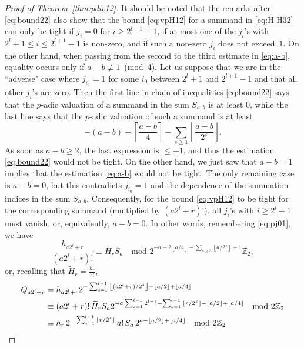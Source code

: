 \documentclass[12pt,reqno]{amsart}
\numberwithin{equation}{section}
\theoremstyle{remark}
\begin{document}
\begin{proof}[Proof of Theorem~{\em \ref{thm:pdiv12}}]
It should be noted that the remarks after \eqref{eq:bound22} also
show that the bound \eqref{eq:vpH12} for a summand in \eqref{eq:H-H32} 
can only be tight if
$j_i=0$ for $i\ge 2^{l+1}+1$, if at most one of the $j_i$'s with
$2^{l}+1\le i\le 2^{l+1}-1$ is non-zero, and if such a non-zero $j_i$
does not exceed~$1$.
On the other hand, when passing from the second to the third estimate in
\eqref{eq:a-b}, equality occurs only if \hbox{$a-b\not\equiv 1$}~(mod~4).
Let us suppose that we are in the ``adverse" case where $j_{i_0}=1$ for
some $i_0$ between $2^l+1$ and $2^{l+1}-1$ and that all other $j_i$'s
are zero. Then the first line in chain of inequalities
\eqref{eq:bound22} says that the $p$-adic valuation of a summand in
the sum $S_{a,b}$ is at least $0$, while the last line says that
the $p$-adic valuation of such a summand is at least
$$
-(a-b)
+{\left\lceil{\frac {a-b} {4}}\right\rceil}
-\sum_{s\ge1}{\left\lfloor{\frac {a-b} {2^{s}}}\right\rfloor}.
$$
As soon as $a-b\ge2$, the last expression is $\le -1$, and thus
the estimation \eqref{eq:bound22} would not be tight.
On the other hand, we just saw that $a-b=1$ implies that the
estimation \eqref{eq:a-b} would not be tight. The only remaining case
is $a-b=0$, but this contradicts $j_{i_0}=1$ and the dependence of
the summation indices in the sum $S_{a,b}$.
Consequently, for the bound \eqref{eq:vpH12} to be tight for the
corresponding summand (multiplied by $(a2^l+r)!$),
all $j_i$'s with $i\ge 2^{l}+1$ 
must vanish, or, equivalently, $a-b=0$. In other words,
remembering \eqref{eq:pj01}, we have
$$
\frac {h_{a2^l+r}} {(a2^l+r)!}\equiv \widetilde H_rS_a\quad 
\text{mod $2^{-a-2{\left\lfloor{{a} /{4}}\right\rfloor}-\sum_{s\ge3}{\left\lfloor{ {a}/ {2^s}}\right\rfloor}+1}{\mathbb{Z}}_2$},
$$
or, recalling that $\widetilde H_r=\frac {h_r} {r!}$,
\begin{align} 
\notag
Q_{a2^l+r}&=h_{a2^l+r}
2^{-\sum_{s=1}^{l-1}{\left\lfloor{ (a2^l+r)/ {2^s}}\right\rfloor}-{\left\lfloor{{a} /{2}}\right\rfloor}+{\left\lfloor{ {a}/ {4}}\right\rfloor}}\\
\notag
&\equiv (a2^l+r)!\,\widetilde H_{r}S_a
2^{-a\sum_{s=1}^{l-1}2^{l-s}
-\sum_{s=1}^{l-1}{\left\lfloor{ {r}/ {2^s}}\right\rfloor}-{\left\lfloor{{a} /{2}}\right\rfloor}+{\left\lfloor{ {a}/ {4}}\right\rfloor}}
\quad \text{mod $2{\mathbb{Z}}_2$}\\
\notag
&\equiv 
h_{r}\,
2^{-\sum_{s=1}^{l-1}{\left\lfloor{ {r}/ {2^s}}\right\rfloor}}
\,a!\,S_a\,
2^{a-{\left\lfloor{{a} /{2}}\right\rfloor}+{\left\lfloor{ {a}/ {4}}\right\rfloor}}
\quad \text{mod $2{\mathbb{Z}}_2$}\\

\end{align}
\end{proof}
\end{document}
